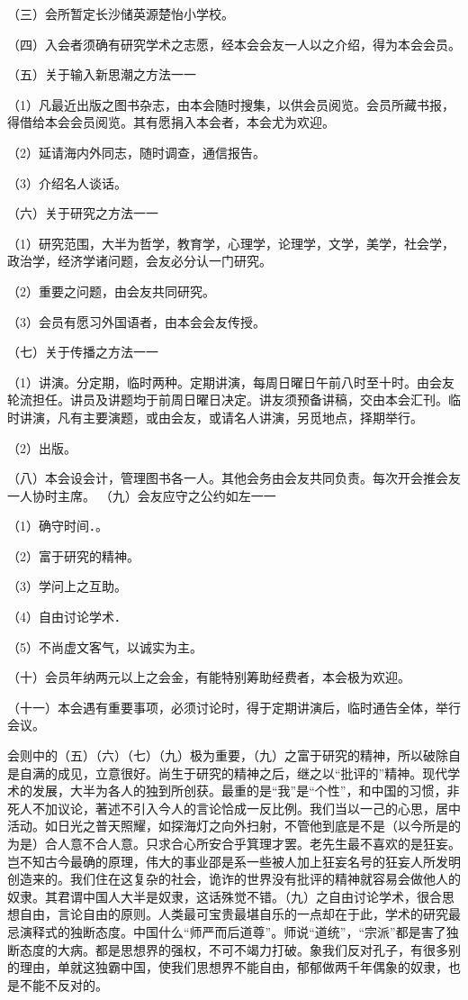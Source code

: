 （三）会所暂定长沙储英源楚怡小学校。

（四）入会者须确有研究学术之志愿，经本会会友一人以之介绍，得为本会会员。

（五）关于输入新思潮之方法一一

（1）凡最近出版之图书杂志，由本会随时搜集，以供会员阅览。会员所藏书报，得借给本会会员阅览。其有愿捐入本会者，本会尤为欢迎。

（2）延请海内外同志，随时调查，通信报告。

（3）介绍名人谈话。

（六）关于研究之方法一一

（1）研究范围，大半为哲学，教育学，心理学，论理学，文学，美学，社会学，政治学，经济学诸问题，会友必分认一门研究。

（2）重要之问题，由会友共同研究。

（3）会员有愿习外国语者，由本会会友传授。

（七）关于传播之方法一一

（1）讲演。分定期，临时两种。定期讲演，每周日曜日午前八时至十时。由会友轮流担任。讲员及讲题均于前周日曜日决定。讲友须预备讲稿，交由本会汇刊。临时讲演，凡有主要演题，或由会友，或请名人讲演，另觅地点，择期举行。

（2）出版。

 （八）本会设会计，管理图书各一人。其他会务由会友共同负责。每次开会推会友一人协时主席。 
（九）会友应守之公约如左一一

（1）确守时间．。

（2）富于研究的精神。

（3）学问上之互助。

（4）自由讨论学术．

（5）不尚虚文客气，以诚实为主。

（十）会员年纳两元以上之会金，有能特别筹助经费者，本会极为欢迎。

（十一）本会遇有重要事项，必须讨论时，得于定期讲演后，临时通告全体，举行会议。

会则中的（五）（六）（七）（九）极为重要，（九）之富于研究的精神，所以破除自是自满的成见，立意很好。尚生于研究的精神之后，继之以“批评的”精神。现代学术的发展，大半为各人的独到所创获。最重的是“我”是“个性”，和中国的习惯，非死人不加议论，著述不引入今人的言论恰成一反比例。我们当以一己的心思，居中活动。如日光之普天照耀，如探海灯之向外扫射，不管他到底是不是（以今所是的为是）合人意不合人意。只求合心所安合乎箕理才罢。老先生最不喜欢的是狂妄。岂不知古今最确的原理，伟大的事业邵是系一些被人加上狂妄名号的狂妄人所发明创造来的。我们住在这复杂的社会，诡诈的世界没有批评的精神就容易会做他人的奴隶。其君谓中国人大半是奴隶，这话殊觉不错。（九）之自由讨论学术，很合思想自由，言论自由的原则。人类最可宝贵最堪自乐的一点却在于此，学术的研究最忌演释式的独断态度。中国什么“师严而后道尊”。师说“道统”，“宗派”都是害了独断态度的大病。都是思想界的强权，不可不竭力打破。象我们反对孔子，有很多别的理由，单就这独霸中国，使我们思想界不能自由，郁郁做两千年偶象的奴隶，也是不能不反对的。

